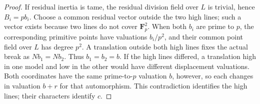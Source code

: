 \begin{proof}
If residual inertia is tame, the residual division field over
\(L\) is trivial, hence \(B_i=pb_i\). Choose a common residual
vector outside the two high lines; such a vector exists because
two lines do not cover \(\mathbf F_p^2\).
When both \(b_i\) are prime to \(p\), the corresponding primitive
points have valuations \(b_i/p^2\), and their common point field
over \(L\) has degree \(p^2\). A translation outside both high
lines fixes the actual break as \(Nb_1=Nb_2\).
Thus \(b_1=b_2=b\). If the high lines differed, a translation
high in one model and low in the other would have different
displacement valuations. Both coordinates have the same
prime-to-\(p\) valuation \(b\), however, so each changes in
valuation \(b+r\) for that automorphism. This contradiction
identifies the high lines; their characters identify \(c\).
\end{proof}

